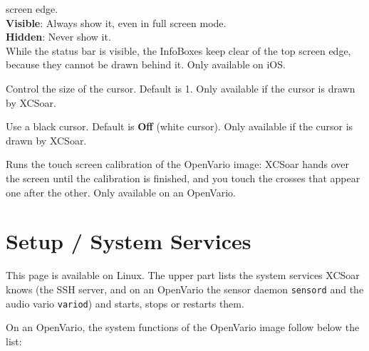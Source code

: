 \begin{description}
  screen edge. \\
  {\bf Visible}: Always show it, even in full screen mode. \\
  {\bf Hidden}: Never show it. \\
  While the status bar is visible, the InfoBoxes keep clear of the top screen
  edge, because they cannot be drawn behind it.
  Only available on iOS.
\item[Cursor zoom]  Control the size of the cursor. Default is 1.
  Only available if the cursor is drawn by XCSoar.
\item[Invert cursor color]  Use a black cursor. Default is {\bf Off}
  (white cursor). Only available if the cursor is drawn by XCSoar.
\item[Calibrate touch screen]  Runs the touch screen calibration of the
  OpenVario image: XCSoar hands over the screen until the calibration is
  finished, and you touch the crosses that appear one after the other.
  Only available on an OpenVario.
\end{description}


\section{Setup / System Services}\label{sec:setup-system-services}

This page is available on Linux.  The upper part lists the system
services XCSoar knows (the SSH server, and on an OpenVario the sensor
daemon \texttt{sensord} and the audio vario \texttt{variod}) and starts,
stops or restarts them.

On an OpenVario, the system functions of the OpenVario image follow
below the list:

